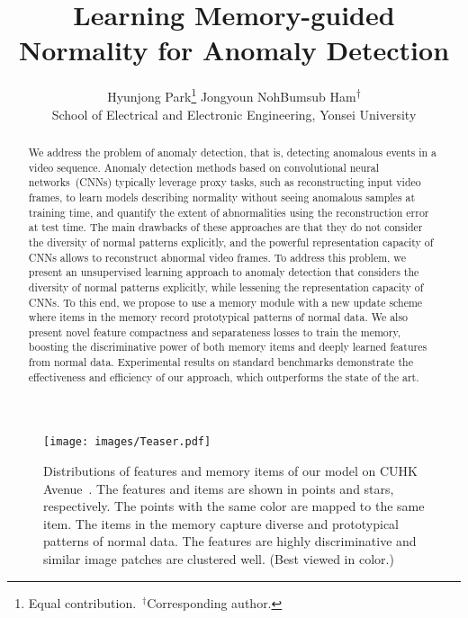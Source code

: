 \documentclass[10pt,twocolumn,letterpaper]{article}
\begin{document}
	
\title{Learning Memory-guided Normality for Anomaly Detection}

\author{Hyunjong Park\thanks{Equal contribution.~$^\dagger$Corresponding author.} \quad\quad\quad Jongyoun Noh\footnotemark[1] \quad\quad\quad Bumsub Ham\textsuperscript{$\dagger$}\vspace*{0.1cm}\\
School of Electrical and Electronic Engineering, Yonsei University\\
}

\maketitle
\thispagestyle{empty}

\begin{abstract}
\vspace{-0.3cm}
We address the problem of anomaly detection, that is, detecting anomalous events in a video sequence. Anomaly detection methods based on convolutional neural networks~(CNNs) typically leverage proxy tasks, such as reconstructing input video frames, to learn models describing normality without seeing anomalous samples at training time, and quantify the extent of abnormalities using the reconstruction error at test time. The main drawbacks of these approaches are that they do not consider the diversity of normal patterns explicitly, and the powerful representation capacity of CNNs allows to reconstruct abnormal video frames. To address this problem, we present an unsupervised learning approach to anomaly detection that considers the diversity of normal patterns explicitly, while lessening the representation capacity of CNNs. To this end, we propose to use a memory module with a new update scheme where items in the memory record prototypical patterns of normal data. We also present novel feature compactness and separateness losses to train the memory, boosting the discriminative power of both memory items and deeply learned features from normal data. Experimental results on standard benchmarks demonstrate the effectiveness and efficiency of our approach, which outperforms the state of the art.

\end{abstract}

	
\begin{figure}[t]
		\centering
		\texttt{[image: images/Teaser.pdf]}
\vspace{-0.1cm}
		\caption{Distributions of features and memory items of our model on CUHK Avenue~\cite{lu2013abnormal}. The features and items are shown in points and stars, respectively. The points with the same color are mapped to the same item. The items in the memory capture diverse and prototypical patterns of normal data. The features are highly discriminative and similar image patches are clustered well. (Best viewed in color.)}
		\vspace{-0.3cm}
		\label{fig:teaser}
    \end{figure}
\end{document}
